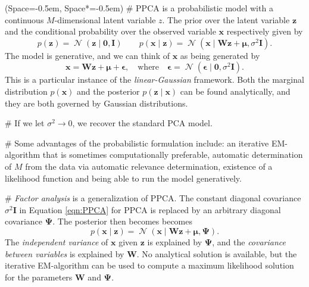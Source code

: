 \documentclass[12pt, a4paper]{article}
\newcommand{\listSpace}{-0.5em}%
\newcommand{\vect}[1]{\bm{#1}}
\DeclareMathOperator{\N}{\mathcal{N}}
\begin{document}
\begin{easylist}[itemize]
	\ListProperties(Space=\listSpace, Space*=\listSpace)
	# PPCA is a probabilistic model with a continuous $M$-dimensional latent variable $z$.
	The prior over the latent variable $\vect{z}$ and the conditional probability over the observed variable $\vect{x}$ respectively given by
	\begin{equation}
	\label{eqn:PPCA}
		p(\vect{z}) = \N \left(\vect{z} \mid \vect{0}, \vect{I} \right)
		\qquad
		p(\vect{x} \mid \vect{z})
		=
		\N \left(\vect{x} \mid \vect{W} \vect{z} + \vect{\mu}, \sigma^2 \vect{I} \right).
	\end{equation}
	The model is generative, and we can think of $\vect{x}$ as being generated by
	\begin{equation*}
	\vect{x} = 
	\vect{W} \vect{z} + \vect{\mu} + \vect{\epsilon},
	\quad \text{where} \quad 
	\vect{\epsilon} = 
	\N \left(\vect{\epsilon} \mid \vect{0}, \sigma^2 \vect{I} \right).
	\end{equation*}
	This is a particular instance of the \emph{linear-Gaussian} framework.
	Both the marginal distribution $p(\vect{x})$ and the posterior $p(\vect{z} \mid \vect{x})$ can be found analytically, and they are both governed by Gaussian distributions.
	
	# If we let $\sigma^2 \to 0$, we recover the standard PCA model.
	
	# Some advantages of the probabilistic formulation include: 
	an iterative EM-algorithm that is sometimes computationally preferable, 
	automatic determination of $M$ from the data via automatic relevance determination, 
	existence of a likelihood function and 
	being able to run the model generatively.
	
	# \emph{Factor analysis} is a generalization of PPCA.
	The constant diagonal covariance $\sigma^2 \vect{I}$ in Equation \eqref{eqn:PPCA} for PPCA is replaced by an arbitrary diagonal covariance $\vect{\Psi}$.
	The posterior then becomes becomes
	\begin{equation*}
	p(\vect{x} \mid \vect{z})
	=
	\N \left(\vect{x} \mid \vect{W} \vect{z} + \vect{\mu}, \vect{\Psi} \right).
	\end{equation*}
	The \emph{independent variance} of $\vect{x}$ given $\vect{z}$ is explained by $\vect{\Psi}$, and the \emph{covariance between variables} is explained by $\vect{W}$.
	No analytical solution is available, but the iterative EM-algorithm can be used to compute a maximum likelihood solution for the parameters $\vect{W}$ and $\vect{\Psi}$.
\end{easylist}
\end{document}
